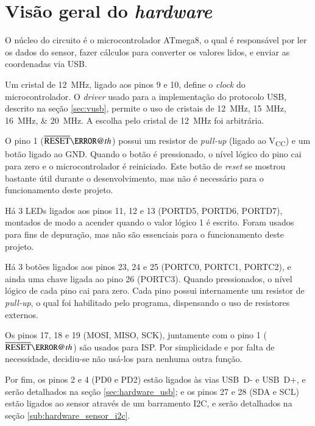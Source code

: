 \documentclass[brazil,pagestart=firstchapter]{abnt}
\makeatletter
\newcommand*{\textoverline}[1]{$\overline{\hbox{#1}}\m@th$}
\newcommand*{\VCC}{V\textsubscript{CC}\xspace}
\newcommand*{\GND}{GND\xspace}
\makeatother
\begin{document}
\newpage


\section{Visão geral do \textit{hardware}}
\label{sec:hardware_visao_geral}

O núcleo do circuito é o microcontrolador ATmega8, o qual é responsável por
ler os dados do sensor, fazer cálculos para converter os valores lidos, e
enviar as coordenadas via \ac{USB}.

Um cristal de \SI{12}{\mega\hertz}, ligado aos pinos 9 e 10, define o
\textit{clock} do microcontrolador. O \textit{driver} usado para a
implementação do protocolo \ac{USB}, descrito na seção \ref{sec:vusb},
permite o uso de cristais de \SIlist[list-final-separator={ ou }]{12; 15;
16; 20}{\mega\hertz}. A escolha pelo cristal de \SI{12}{\mega\hertz} foi
arbitrária.

O pino 1 (\textoverline{RESET}) possui um resistor de \textit{pull-up}
(ligado ao \VCC) e um botão ligado ao \GND. Quando o botão é pressionado, o
nível lógico do pino cai para zero e o microcontrolador é reiniciado. Este
botão de \textit{reset} se mostrou bastante útil durante o desenvolvimento,
mas não é necessário para o funcionamento deste projeto.

Há 3 \acp{LED} ligados aos pinos 11, 12 e 13 (PORTD5, PORTD6, PORTD7),
montados de modo a acender quando o valor lógico 1 é escrito. Foram usados
para fins de depuração, mas não são essenciais para o funcionamento deste
projeto.

Há 3 botões ligados aos pinos 23, 24 e 25 (PORTC0, PORTC1, PORTC2), e ainda
uma chave ligada ao pino 26 (PORTC3). Quando pressionados, o nível lógico de
cada pino cai para zero. Cada pino possui internamente um resistor de
\textit{pull-up}, o qual foi habilitado pelo programa, dispensando o uso de
resistores externos.

Os pinos 17, 18 e 19 (MOSI, MISO, SCK), juntamente com o pino 1
(\textoverline{RESET}) são usados para \ac{ISP}. Por simplicidade e por
falta de necessidade, decidiu-se não usá-los para nenhuma outra função.

Por fim, os pinos 2 e 4 (PD0 e PD2) estão ligados às vias USB~D- e USB~D+, e
serão detalhados na seção \ref{sec:hardware_usb}; e os pinos 27 e 28 (SDA e
SCL) estão ligados ao sensor através de um barramento \ac{I2C}, e serão
detalhados na seção \ref{sub:hardware_sensor_i2c}.
\end{document}
